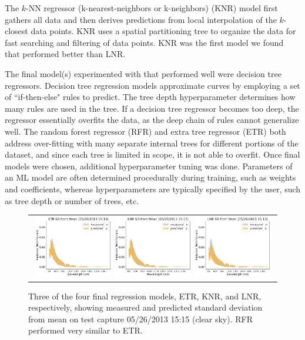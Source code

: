 The $k$-NN regressor (k-nearest-neighbors or k-neighbors) (KNR) model first gathers all data and then derives predictions from local interpolation of the $k$-closest data points. KNR uses a spatial partitioning tree to organize the data for fast searching and filtering of data points. KNR was the first model we found that performed better than LNR. 

The final model(s) experimented with that performed well were decision tree regressors. Decision tree regression models approximate curves by employing a set of ``if-then-else" rules to predict. The tree depth hyperparameter determines how many rules are used in the tree. If a decision tree regressor becomes too deep, the regressor essentially overfits the data, as the deep chain of rules cannot generalize well. The random forest regressor (RFR)\cite{kocev_tree} and extra tree regressor (ETR)\cite{geurts_etr} both address over-fitting with many separate internal trees for different portions of the dataset, and since each tree is limited in scope, it is not able to overfit. Once final models were chosen, additional hyperparameter tuning was done. Parameters of an ML model are often determined procedurally during training, such as weights and coefficients, whereas hyperparameters are typically specified by the user, such as tree depth or number of trees, etc.

\begin{figure} [hbtp]
\begin{center}
\begin{tabular}{c}
\includegraphics[width=0.32\textwidth]{img/model_etr_sd.png}
\includegraphics[width=0.32\textwidth]{img/model_knr_sd.png}
\includegraphics[width=0.32\textwidth]{img/model_lnr_sd.png}
\end{tabular}
\end{center}
\caption[prelimresults] { \label{fig:prelimresults}Three of the four final regression models, ETR, KNR, and LNR, respectively, showing measured and predicted standard deviation from mean on test capture 05/26/2013 15:15 (clear sky). RFR performed very similar to ETR.}
\end{figure}

